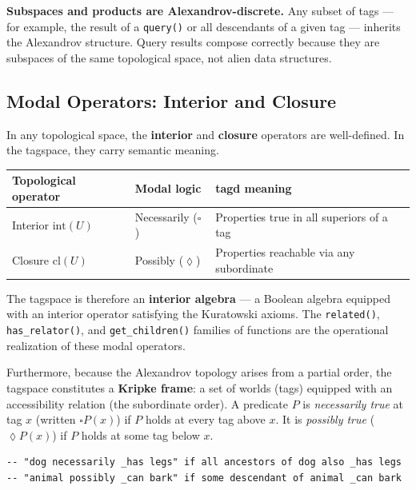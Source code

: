 \documentclass{article}
\begin{document}
\textbf{Subspaces and products are Alexandrov-discrete.} Any subset of tags ---
for example, the result of a \texttt{query()} or all descendants of a given tag
--- inherits the Alexandrov structure. Query results compose correctly because
they are subspaces of the same topological space, not alien data structures.

\subsection{Modal Operators: Interior and Closure}
\label{sec:modal}

In any topological space, the \textbf{interior} and \textbf{closure} operators
are well-defined. In the tagspace, they carry semantic meaning.

\begin{center}
\begin{tabular}{lll}
\toprule
\textbf{Topological operator} & \textbf{Modal logic} & \textbf{tagd meaning} \\
\midrule
Interior $\mathrm{int}(U)$ & Necessarily ($\square$) & Properties true in all superiors of a tag \\
Closure $\mathrm{cl}(U)$ & Possibly ($\lozenge$) & Properties reachable via any subordinate \\
\bottomrule
\end{tabular}
\end{center}

\bigskip

The tagspace is therefore an \textbf{interior algebra} --- a Boolean algebra
equipped with an interior operator satisfying the Kuratowski axioms. The
\texttt{related()}, \texttt{has\_relator()}, and \texttt{get\_children()}
families of functions are the operational realization of these modal operators.

Furthermore, because the Alexandrov topology arises from a partial order, the
tagspace constitutes a \textbf{Kripke frame}: a set of worlds (tags) equipped
with an accessibility relation (the subordinate order). A predicate $P$ is
\emph{necessarily true} at tag $x$ (written $\square P(x)$) if $P$ holds at
every tag above $x$. It is \emph{possibly true} ($\lozenge P(x)$) if $P$
holds at some tag below $x$.

\begin{lstlisting}[style=tagl, caption={Modal reading of TAGL predicates}]
-- "dog necessarily _has legs" if all ancestors of dog also _has legs
-- "animal possibly _can bark" if some descendant of animal _can bark
\end{lstlisting}
\end{document}

